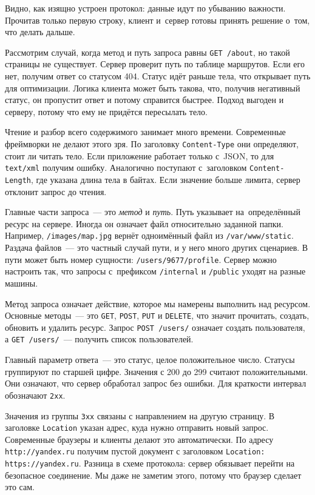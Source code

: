 Видно, как изящно устроен протокол: данные идут по убыванию важности. Прочитав
только первую строку, клиент и~сервер готовы принять решение о~том, что делать
дальше.


Рассмотрим случай, когда метод и путь запроса равны \texttt{GET /about}, но
такой страницы не существует. Сервер проверит путь по таблице маршрутов. Если
его нет, получим ответ со статусом 404. Статус идёт раньше тела, что открывает
путь для оптимизации. Логика клиента может быть такова, что, получив негативный
статус, он пропустит ответ и потому справится быстрее. Подход выгоден и серверу,
потому что ему не придётся пересылать тело.

Чтение и разбор всего содержимого занимает много времени. Современные фреймворки не
делают этого зря. По заголовку \verb|Content-Type| они определяют, стоит ли
читать тело. Если приложение работает только с~JSON, то для \verb|text/xml|
получим ошибку. Аналогично поступают с~заголовком \verb|Content-Length|, где
указана длина тела в байтах. Если значение больше лимита, сервер отклонит запрос
до чтения.

Главные части запроса~--- это \emph{метод} и \emph{путь}. Путь указывает
на~определённый ресурс на сервере. Иногда он означает файл относительно заданной
папки. Например, \verb|/images/map.jpg| вернёт одноимённый файл из
\verb|/var/www/static|. Раздача файлов~--- это частный случай пути, и у него много других
сценариев. В пути может быть номер сущности: \verb|/users/9677/profile|. Сервер
можно настроить так, что запросы с~префиксом \verb|/internal| и \verb|/public|
уходят на разные машины.

Метод запроса означает действие, которое мы намерены выполнить над
ресурсом. Основные методы~--- это \verb|GET|, \verb|POST|, \verb|PUT| и
\verb|DELETE|, что значит прочитать, создать, обновить и удалить ресурс. Запрос
\verb|POST /users/| означает создать пользователя, а \verb|GET /users/|~---
получить список пользователей.

Главный параметр ответа~--- это статус, целое положительное число. Статусы
группируют по старшей цифре. Значения с 200 до 299 считают положительными. Они
означают, что сервер обработал запрос без ошибки. Для краткости интервал
обозначают \verb|2хх|.

Значения из группы \verb|3хх| связаны с направлением на другую страницу. В
заголовке \verb|Location| указан адрес, куда нужно отправить новый
запрос. Современные браузеры и клиенты делают это автоматически. По адресу
\verb|http://yandex.ru| получим пустой документ с заголовком
\texttt{Location: https://yandex.ru}. Разница в схеме протокола: сервер обязывает
перейти на безопасное соединение. Мы даже не заметим этого, потому что браузер
сделает это сам.

